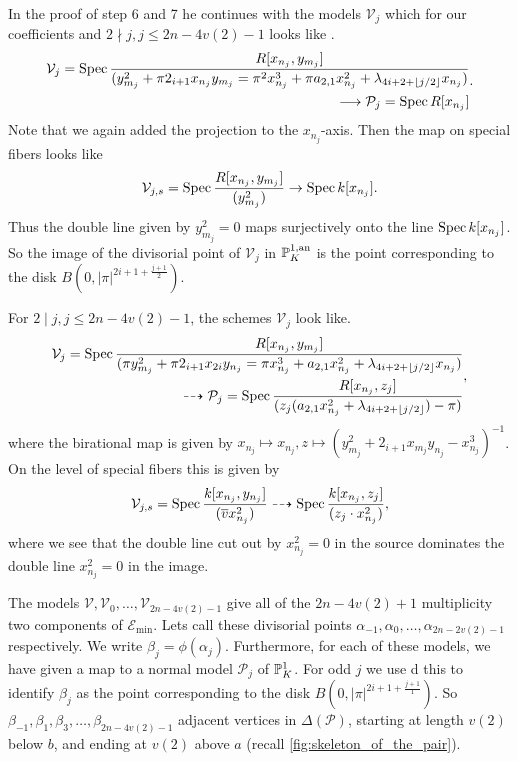 In the proof of step 6 and 7 he continues with the models $\mathcal{V} _j$ which for our coefficients and $2 \nmid j, j\le 2n - 4v(2) - 1$ looks like . 
\[
	\begin{aligned}
	\mathcal{V} _j = \operatorname{Spec} \frac{R[x_{n_{j}}, y_{m_j}]}{(y_{m_j}^2 + \pi 2_{i + 1} x_{n_j}y_{m_j} = \pi^2 x_{n_j}^3 + \pi a_{2, 1} x_{n_j}^2 + \lambda_{4i + 2 + \left\lfloor j / 2 \right\rfloor} x_{n_j}) } \\ 
	\longrightarrow  \mathcal{P} _{j} = \operatorname{Spec} R[x_{n_j}]
	\end{aligned}
.\] 
Note that we again added the projection to the $x_{n_j}$-axis. 
Then the map on special fibers looks like \[
	\mathcal{V} _{j, s} = \operatorname{Spec} \frac{R[x_{n_j}, y_{m_j}]}{(y_{m_j}^2)} \to \operatorname{Spec} k[x_{n_j}]
.\] 
Thus the double line given by $y_{m_j}^2 = 0$ maps surjectively onto the line $\operatorname{Spec} k[x_{n_j}]$. 
So the image of the divisorial point of $\mathcal{V} _j$ in $\mathbb{P}^{1, \text{an}}_K$ is the point corresponding to the disk $B(0, |\pi|^{2i + 1 + \frac{j + 1}{2}})$. 

For $2 \mid j, j \le 2n - 4v(2) - 1$, the schemes $\mathcal{V} _j$ look like. 
\[
	\begin{aligned}
		\mathcal{V}_j = \operatorname{Spec} \frac{R[x_{n_j},y_{m_j}]}{(\pi y^2_{m_j} + \pi 2_{{i + 1}}x_{2i}y_{n_j} = \pi x_{n_j}^3 + a_{2,1}x_{n_j}^2 + \lambda_{4i + 2 + \left\lfloor j / 2 \right\rfloor} x_{n_j})} \\ \dashrightarrow  \mathcal{P} _{j} =  \operatorname{Spec} \frac{R[ x_{n_j}, z_j]}{(z_j(a_{2,1} x_{n_j}^2 + \lambda_{4i + 2 + \left\lfloor j / 2 \right\rfloor})- \pi)} 
	\end{aligned}
,\]
where the birational map is given by $x_{n_j} \mapsto  x_{n_j}, z \mapsto (y^2_{m_j} + 2_{i + 1 }x_{m_j}y_{n_j} -  x_{n_j}^3)^{-1}$. 
On the level of special fibers this is given by \[
	\mathcal{V} _{j, s} = \operatorname{Spec} \frac{k[x_{n_j}, y_{n_j}]}{(\overline{v}x^2_{n_j})} \dashrightarrow \operatorname{Spec} \frac{k[x_{n_j}, z_j]}{(z_j \cdot  x^2_{n_j})}
,\]
where we see that the double line cut out by  $x_{n_j}^2 = 0$ in the source dominates the double line $x_{n_j}^2 = 0$ in the image. 


\bigskip

The models $\mathcal{V} , \mathcal{V} _{0}, \ldots, \mathcal{V} _{2n - 4v(2) - 1}$ give all of the $2n - 4v(2) + 1$ multiplicity two components of  $\mathscr E_\text{min} $. 
Lets call these divisorial points $\alpha_{-1}, \alpha_0, \ldots, \alpha_{2n-2v(2) - 1}$ respectively. 
We write $\beta_j = \phi(\alpha_j)$. 
Furthermore, for each of these models, we have given a map to a normal model $\mathcal{P} _{j}$ of $\mathbb{P}^{1}_{K}$. 
For odd $j$ we use d this to identify $\beta_j$ as the point corresponding to the disk $B(0, |\pi|^{2i + 1 + \frac{j + 1}{1}})$.
So $\beta_{-1}, \beta_1, \beta_{3}, \ldots, \beta_{2n - 4v(2) - 1}$ adjacent vertices in $\Delta(\mathscr P)$, starting at length $v(2)$ below $b$, and ending at $v(2)$ above $a$ (recall \cref{fig:skeleton_of_the_pair}).

